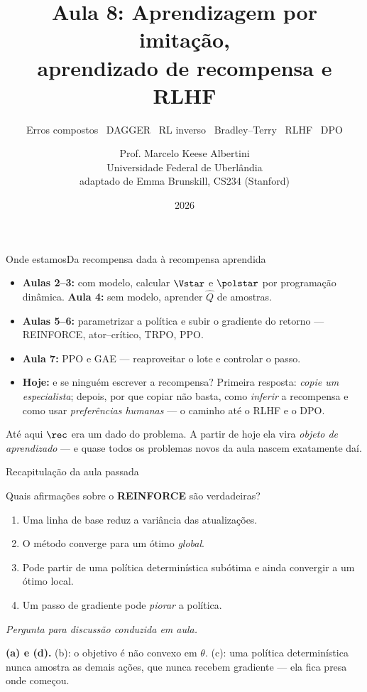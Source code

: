 \documentclass[aspectratio=169, 11pt]{beamer}
\title[Aula 8 — Imitação, recompensa e RLHF]{Aula 8: Aprendizagem por imitação,\\ aprendizado de recompensa e RLHF}
\subtitle[Aprendizagem por Reforço]{Erros compostos \textbullet\ DAGGER \textbullet\ RL inverso \textbullet\ Bradley--Terry \textbullet\ RLHF \textbullet\ DPO}
\author[Prof. Marcelo K. Albertini]{Prof. Marcelo Keese Albertini \\
  \footnotesize Universidade Federal de Uberlândia \\
  \footnotesize adaptado de Emma Brunskill, CS234 (Stanford)}
\institute{Universidade Federal de Uberlândia}
\date{2026}
\newcommand{\paradiscussao}{\smallskip
  {\footnotesize\color{rlCinza}\itshape Pergunta para discussão conduzida em aula.}}
\newcommand{\thv}{\theta}
\newcommand{\Qhat}{\hat{Q}}
\begin{document}
\begin{frame}\titlepage\end{frame}

\begin{frame}{Onde estamos}{Da recompensa dada à recompensa aprendida}

  \begin{itemize}\setlength{\itemsep}{0.45ex}
    \item \textbf{Aulas 2--3:} com modelo, calcular $\Vstar$ e $\polstar$ por
      programação dinâmica. \textbf{Aula 4:} sem modelo, aprender $\Qhat$ de
      amostras.
    \item \textbf{Aulas 5--6:} parametrizar a política e subir o gradiente do
      retorno --- REINFORCE, ator--crítico, TRPO, PPO.
    \item \textbf{Aula 7:} PPO e GAE --- reaproveitar o lote e controlar o passo.
    \item \textbf{Hoje:} e se ninguém escrever a recompensa? Primeira resposta:
      \emph{copie um especialista}; depois, por que copiar não basta, como
      \emph{inferir} a recompensa e como usar \emph{preferências humanas} --- o
      caminho até o RLHF e o DPO.
  \end{itemize}

  \begin{ideiabox}
    Até aqui $\rec$ era um dado do problema. A partir de hoje ela vira
    \emph{objeto de aprendizado} --- e quase todos os problemas novos da aula
    nascem exatamente daí.
  \end{ideiabox}
\end{frame}

\begin{frame}{Recapitulação da aula passada}

  \begin{quizbox}{}
    Quais afirmações sobre o \textbf{REINFORCE} são verdadeiras?
    \begin{enumerate}\setlength{\itemsep}{0ex}
      \item[(a)] Uma linha de base reduz a variância das atualizações.
      \item[(b)] O método converge para um ótimo \emph{global}.
      \item[(c)] Pode partir de uma política determinística subótima e ainda
        convergir a um ótimo local.
      \item[(d)] Um passo de gradiente pode \emph{piorar} a política.
    \end{enumerate}
    \vspace{-0.3em}\paradiscussao
  \end{quizbox}

  \pause

  \begin{respbox}
    \textbf{(a) e (d).} \;(b): o objetivo é não convexo em $\thv$. \;(c): uma
    política determinística nunca amostra as demais ações, que nunca recebem
    gradiente --- ela fica presa onde começou.
  \end{respbox}
\end{frame}
\end{document}
